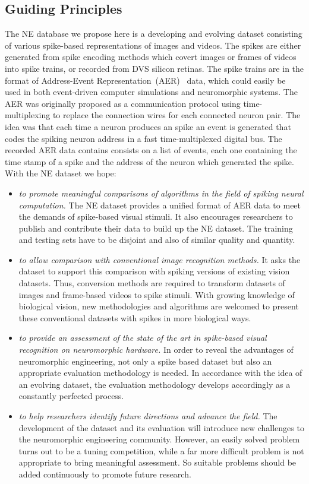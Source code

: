 \documentclass{frontiersENG} %
\begin{document}
\subsection{Guiding Principles}
The NE database we propose here is a developing and evolving dataset consisting of various spike-based representations of images and videos.
The spikes are either generated from spike encoding methods which covert images or frames of videos into spike trains, or recorded from DVS silicon retinas.
The spike trains are in the format of Address-Event Representation~(AER)~\citep{mahowald1992vlsi} data, which could easily be used in both event-driven computer simulations and neuromorphic systems.
The AER was originally proposed as a communication protocol using time-multiplexing to replace the connection wires for each connected neuron pair.
The idea was that each time a neuron produces an spike an event is generated that codes the spiking neuron address in a fast time-multiplexed digital bus.
The recorded AER data contains consists on a list of events, each one containing the time stamp of a spike and the address of the neuron which generated the spike.
With the NE dataset we hope:
\begin{itemize}
	\item \textit{to promote meaningful comparisons of algorithms in the field of spiking neural computation.}
	The NE dataset provides a unified format of AER data to meet the demands of spike-based visual stimuli.
	It also encourages researchers to publish and contribute their data to build up the NE dataset.
	The training and testing sets have to be disjoint and also of similar quality and quantity.
	\item \textit{to allow comparison with conventional image recognition methods.}
	It asks the dataset to support this comparison with spiking versions of existing vision datasets.
	Thus, conversion methods are required to transform datasets of images and frame-based videos to spike stimuli.
	With growing knowledge of biological vision, new methodologies and algorithms are welcomed to present these conventional datasets with spikes in more biological ways.
	\item \textit{to provide an assessment of the state of the art in spike-based visual recognition on neuromorphic hardware.}
	In order to reveal the advantages of neuromorphic engineering, not only a spike based dataset but also an appropriate evaluation methodology is needed.
	In accordance with the idea of an evolving dataset, the evaluation methodology develops accordingly as a constantly perfected process.
	\item \textit{to help researchers identify future directions and advance the field.}
	The development of the dataset and its evaluation will introduce new challenges to the neuromorphic engineering community.
	However, an easily solved problem turns out to be a tuning competition, while a far more difficult problem is not appropriate to bring meaningful assessment.
	So suitable problems should be added continuously to promote future research.  
\end{itemize}
\end{document}
